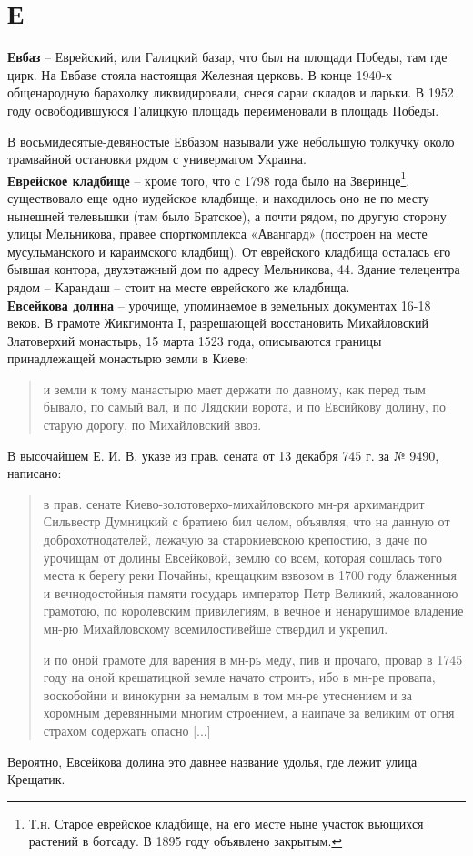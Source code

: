 \chapter*{Е}

\textbf{Евбаз} – Еврейский, или Галицкий базар, что был на площади Победы, там где цирк. На Евбазе стояла настоящая Железная церковь. В конце 1940-х общенародную барахолку ликвидировали, снеся сараи складов и ларьки. В 1952 году освободившуюся Галицкую площадь переименовали в площадь Победы.

В восьмидесятые-девяностые Евбазом называли уже небольшую толкучку около трамвайной остановки рядом с универмагом Украина.\\

\textbf{Еврейское кладбище} – кроме того, что с 1798 года было на Зверинце\footnote{Т.н. Старое еврейское кладбище, на его месте ныне участок вьющихся растений в ботсаду. В 1895 году объявлено закрытым.}, существовало еще одно иудейское кладбище, и находилось оно не по месту нынешней телевышки (там было Братское), а почти рядом, по другую сторону улицы Мельникова, правее спорткомплекса «Авангард» (построен на месте мусульманского и караимского кладбищ). От еврейского кладбища осталась его бывшая контора, двухэтажный дом по адресу Мельникова, 44. Здание телецентра рядом – Карандаш – стоит на месте еврейского же кладбища.\\

\textbf{Евсейкова долина} – урочище, упоминаемое в земельных документах 16-18 веков. В грамоте Жикгимонта I, разрешающей восстановить Михайловский Златоверхий монастырь, 15 марта 1523 года, описываются границы принадлежащей монастырю земли в Киеве:

\begin{quotation}
и земли к тому манастырю мает держати по давному, как перед тым бывало, по самый вал, и по Лядскии ворота, и по Евсийкову долину, по старую дорогу, по Михайловский ввоз.
\end{quotation}

В высочайшем Е. И. В. указе из прав. сената от 13 декабря 745 г. за № 9490, написано: 

\begin{quotation}
в прав. сенате Киево-золотоверхо-михайловского мн-ря архимандрит Си\-львестр Думницкий с братиею бил челом, объявляя, что на данную от доброхотнодателей, лежачую за старокиевскою крепостию, в даче по урочищам от долины Евсейковой, землю со всем, которая сошлась того места к берегу реки Почайны, крещацким взвозом в 1700 году блаженныя и вечнодостойныя памяти государь император Петр Великий, жалованною грамотою, по королевским привилегиям, в вечное и ненарушимое владение мн-рю Михайловскому всемилостивейше ствердил и укрепил. 

и по оной грамоте для варения в мн-рь меду, пив и прочаго, провар в 1745 году на оной крещатицкой земле начато строить, ибо в мн-ре провапа, воскобойни и винокурни за немалым в том мн-ре утеснением и за хоромным деревянными многим строением, а наипаче за великим от огня страхом содержать опасно [...]
\end{quotation}

Вероятно, Евсейкова долина это давнее название удолья, где лежит улица Крещатик.\\
